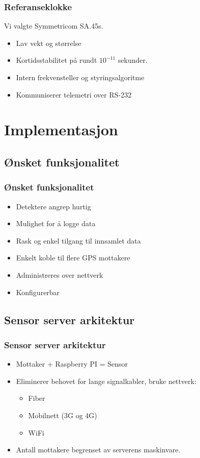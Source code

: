 \documentclass[xcolor=table]{beamer}
\begin{document}
\begin{frame}
  \frametitle{Referanseklokke}
  Vi valgte Symmetricom SA.45s. 
  \begin{itemize}
    \item Lav vekt og størrelse
    \item Kortidsstabilitet på rundt $10^{-11}$ sekunder.
    \item Intern frekvensteller og styringsalgoritme
    \item Kommuniserer telemetri over RS-232
  \end{itemize}
\end{frame}

\section{Implementasjon}
\subsection{Ønsket funksjonalitet}
\begin{frame}
  \frametitle{Ønsket funksjonalitet}
  \begin{itemize}
    \item Detektere angrep hurtig
    \item Mulighet for å logge data
    \item Rask og enkel tilgang til innsamlet data
    \item Enkelt koble til flere GPS mottakere
    \item Administreres over nettverk
    \item Konfigurerbar 
  \end{itemize}
\end{frame}

\subsection{Sensor server arkitektur}
\begin{frame}
  \frametitle{Sensor server arkitektur}
  \begin{itemize}
    \item Mottaker + Raspberry PI = Sensor
    \item Eliminerer behovet for lange signalkabler, bruke nettverk:
    \begin{itemize}
      \item Fiber
      \item Mobilnett (3G og 4G)
      \item WiFi
    \end{itemize}
    \item Antall mottakere begrenset av serverens maskinvare.
  \end{itemize}
\end{frame}
\end{document}
